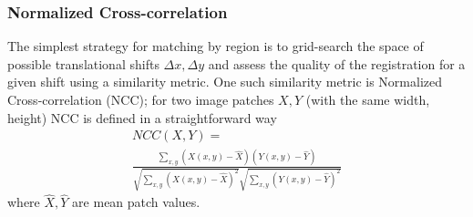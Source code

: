 \subsubsection{Normalized Cross-correlation}
The simplest strategy for matching by region is to grid-search the space of possible translational shifts \(\Delta x, \Delta y\) and assess the quality of the registration for a given shift using a similarity metric.
%
One such similarity metric is Normalized Cross-correlation (NCC); for two image patches \(X, Y\) (with the same width, height) NCC is defined in a straightforward way
\begin{multline}
	NCC(X, Y) = \\ \frac{\sum_{x,y} \left(X(x,y) - \hat{X}\right) \left(Y(x,y) - \hat{Y}\right)}{\sqrt{\sum_{x,y} \left(X(x,y) - \hat{X}\right)^2} \sqrt{ \sum_{x,y} \left(Y(x,y) - \hat{Y}\right)^2 }}
\end{multline}
where \(\hat{X}, \hat{Y}\) are mean patch values.

